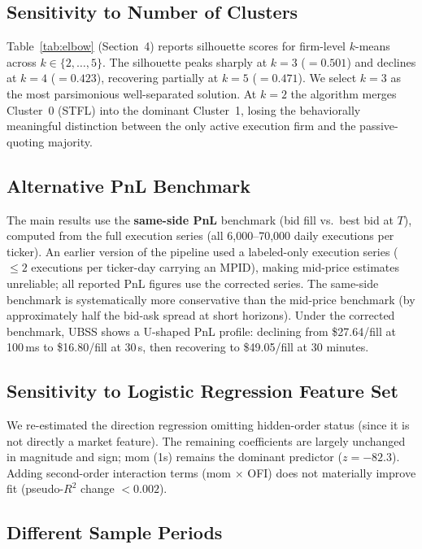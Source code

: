 \documentclass[11pt, letterpaper]{article}
\begin{document}
\subsection{Sensitivity to Number of Clusters}

Table~\ref{tab:elbow} (Section~4) reports silhouette scores for firm-level
$k$-means across $k \in \{2, \ldots, 5\}$.
The silhouette peaks sharply at $k=3$ ($= 0.501$) and declines at $k=4$
($= 0.423$), recovering partially at $k=5$ ($= 0.471$).
We select $k=3$ as the most parsimonious well-separated solution.
At $k=2$ the algorithm merges Cluster~0 (STFL) into the dominant Cluster~1,
losing the behaviorally meaningful distinction between the only active
execution firm and the passive-quoting majority.

\subsection{Alternative PnL Benchmark}

The main results use the \textbf{same-side PnL} benchmark (bid fill vs.\ best
bid at $T$), computed from the full execution series (all 6,000--70,000 daily
executions per ticker).
An earlier version of the pipeline used a labeled-only execution series
($\leq 2$ executions per ticker-day carrying an MPID), making mid-price
estimates unreliable; all reported PnL figures use the corrected series.
The same-side benchmark is systematically more conservative than the mid-price
benchmark (by approximately half the bid-ask spread at short horizons).
Under the corrected benchmark, UBSS shows a U-shaped PnL profile: declining
from \$27.64/fill at 100\,ms to \$16.80/fill at 30\,s, then recovering to
\$49.05/fill at 30 minutes.

\subsection{Sensitivity to Logistic Regression Feature Set}

We re-estimated the direction regression omitting hidden-order status
(since it is not directly a market feature).
The remaining coefficients are largely unchanged in magnitude and sign;
mom (1s) remains the dominant predictor ($z = -82.3$).
Adding second-order interaction terms (mom $\times$ OFI) does not materially
improve fit (pseudo-$R^2$ change $< 0.002$).

\subsection{Different Sample Periods}
\end{document}
